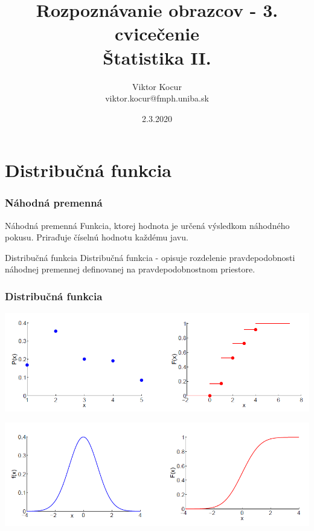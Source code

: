 \documentclass{beamer}
\title[Príznaky]{Rozpoznávanie obrazcov - 3. cvicečenie \\ Štatistika II.}
\author[Viktor Kocur]{Viktor Kocur \\{\small viktor.kocur@fmph.uniba.sk}}
\institute{DAI FMFI UK}
\date{2.3.2020}
\begin{document}

\begin{frame}[plain]
  \titlepage  
\end{frame}

\section{Distribučná funkcia}

\begin{frame}
\frametitle{Náhodná premenná}

\begin{block}{Náhodná premenná}
Funkcia, ktorej hodnota je určená výsledkom náhodného pokusu. Priraďuje číselnú hodnotu každému javu.
\end{block}

\begin{block}{Distribučná funkcia}
Distribučná funkcia - opisuje rozdelenie pravdepodobnosti náhodnej premennej definovanej na pravdepodobnostnom priestore.
\end{block}
\end{frame}

\begin{frame}
\frametitle{Distribučná funkcia}

\includegraphics[width=\textwidth]{df1.png}

\includegraphics[width=\textwidth]{df2.png}
\end{frame}
\end{document}
